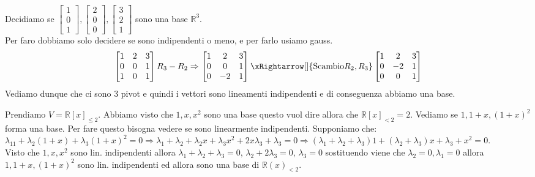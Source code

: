 \begin{example}
Decidiamo se $\begin{bmatrix}1\\0\\1\end{bmatrix}, \begin{bmatrix}2\\0\\0\end{bmatrix}, \begin{bmatrix}3\\2\\1\end{bmatrix}$ sono una base $\mathbb{R}^3$. \\Per faro dobbiamo solo decidere se sono indipendenti o meno, e per farlo usiamo gauss.
\[
\begin{bmatrix}
1 & 2 & 3\\
0 & 0 & 1\\
1 & 0 & 1
\end{bmatrix}
R_3 - R_2 \Rightarrow
\begin{bmatrix}
1 & 2 & 3\\
0 & 0 & 1\\
0 & -2 & 1
\end{bmatrix}
\xRightarrow[]{\text{Scambio} R_2, R_3}
\begin{bmatrix}
1 & 2 & 3\\
0 & -2 & 1\\
0 & 0 & 1
\end{bmatrix}
\]
Vediamo dunque che ci sono 3 pivot e quindi i vettori sono lineamenti indipendenti e di conseguenza abbiamo una base.
\end{example}

\begin{example}
Prendiamo $V = \mathbb{R}[x]_{\leq 2}$. Abbiamo visto che $1, x, x^2$ sono una base questo vuol dire allora che $\mathbb{R}[x]_{< 2} = 2$. Vediamo se $1, 1+x, (1+x)^2$ forma una base. Per fare questo bisogna vedere se sono linearmente indipendenti. Supponiamo che:
$\lambda_11 + \lambda_2(1+x) + \lambda_3(1+x)^2 = 0 \Rightarrow \lambda_1 + \lambda_2 + \lambda_2x + \lambda_3x^2 + 2x\lambda_3 + \lambda_3 = 0 \Rightarrow (\lambda_1 + \lambda_2 + \lambda_3)1 + (\lambda_2 +\lambda_3)x + \lambda_3 + x^2 = 0$.\\
Visto che $1, x, x^2$ sono lin. indipendenti allora $\lambda_1 + \lambda_2 + \lambda_3 = 0$, $\lambda_2 + 2\lambda_3 = 0$, $\lambda_3 = 0$ sostituendo viene che $\lambda_2 = 0, \lambda_1 = 0$ allora $1, 1+x, (1+x)^2$ sono lin. indipendenti ed allora sono una base di $\mathbb{R}(x)_{<2}$.
\end{example}

